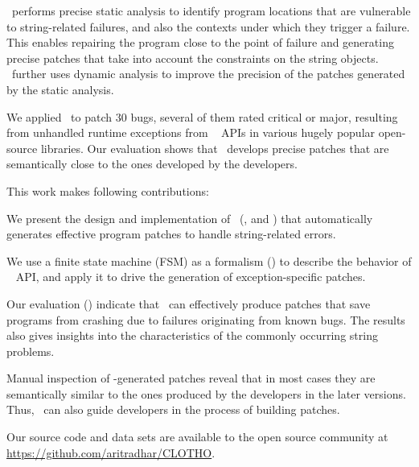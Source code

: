 \tool\ performs precise static analysis to identify program locations that are
vulnerable to string-related failures, and also the contexts under which they
trigger a failure. This enables repairing the program close to the point of
failure and generating precise patches that take into account the constraints on
the string objects.
\tool\ further uses dynamic analysis to improve the precision of the patches
generated by the static analysis.

We applied \tool\ to patch $30$ bugs, several of them rated critical or major,
resulting from unhandled runtime exceptions from \java\  APIs in
various hugely popular open-source libraries. Our evaluation shows that \tool\ 
develops precise patches that are semantically close to the ones developed by
the developers.

This work makes following contributions:
\begin{mylist}

\item We present the design and implementation of \tool\ (,
\xref{sec:design} and \xref{sec:implementation}) that automatically generates effective
program patches to handle string-related errors.

\item We use a finite state machine (FSM) as a formalism () to
describe the behavior of \java\ \code{String} API, and apply it to drive the
generation of exception-specific patches.

\item  Our evaluation () indicate that \tool\ can effectively
produce patches that save programs from crashing due to failures originating
from known bugs. The results also gives insights into the characteristics of the
commonly occurring string problems.

\item Manual inspection of \tool-generated patches reveal that in most cases
they are semantically similar to the ones produced by the developers in the
later versions. %
Thus, \tool\ can also guide developers in the process of building patches.
\end{mylist}

Our source code and data sets are available to the open source community at
\url{https://github.com/aritradhar/CLOTHO}.









